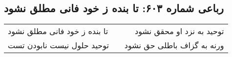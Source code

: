 \begin{center}
\section*{رباعی شماره ۶۰۳: تا بنده ز خود فانی مطلق نشود}
\label{sec:0603}
\begin{longtable}{l p{0.5cm} r}
تا بنده ز خود فانی مطلق نشود
&&
توحید به نزد او محقق نشود
\\
توحید حلول نیست نابودن تست
&&
ورنه به گزاف باطلی حق نشود
\\
\end{longtable}
\end{center}
